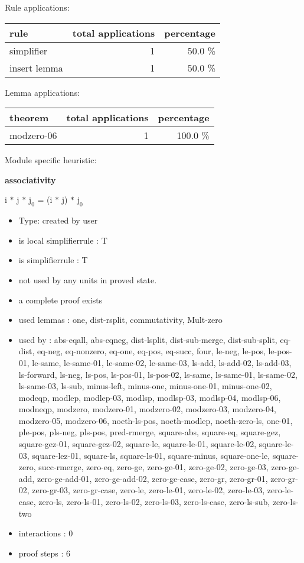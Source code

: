 \documentclass[a4paper]{article}
\begin{document}
Rule applications:

\begin{supertabular}{l|r|r}
rule	        & total applications & percentage \\ \hline
simplifier & 1 & 50.0 \% \\
insert lemma & 1 & 50.0 \% \\

\end{supertabular}

Lemma applications:

\begin{supertabular}{l|r|r}
theorem	        & total applications & percentage \\ \hline
modzero-06 & 1 & 100.0 \% \\

\end{supertabular}

Module specific heuristic:

\pagebreak

{\LARGE\bf associativity}\label{lemma-associativity}

\medskip

 \Fol i $*$ j $*$ $\mbox{j}_{0}$ = (i $*$ j) $*$ $\mbox{j}_{0}$

\begin{itemize}

\item Type: created by user

\item is local simplifierrule : T
\item is simplifierrule : T
\item not used by any units in proved state.
\item       a complete proof exists
\item       used lemmas  : one, dist-rsplit, commutativity, Mult-zero
\item       used by      : abs-eqall, abs-eqneg, dist-lsplit, dist-sub-merge, dist-sub-split, eq-dist, eq-neg, eq-nonzero, eq-one, eq-pos, eq-succ, four, le-neg, le-pos, le-pos-01, le-same, le-same-01, le-same-02, le-same-03, ls-add, ls-add-02, ls-add-03, ls-forward, ls-neg, ls-pos, ls-pos-01, ls-pos-02, ls-same, ls-same-01, ls-same-02, ls-same-03, ls-sub, minus-left, minus-one, minus-one-01, minus-one-02, modeqp, modlep, modlep-03, modlsp, modlsp-03, modlsp-04, modlsp-06, modneqp, modzero, modzero-01, modzero-02, modzero-03, modzero-04, modzero-05, modzero-06, noeth-ls-pos, noeth-modlep, noeth-zero-ls, one-01, ple-pos, pls-neg, pls-pos, pred-rmerge, square-abs, square-eq, square-gez, square-gez-01, square-gez-02, square-le, square-le-01, square-le-02, square-le-03, square-lez-01, square-ls, square-ls-01, square-minus, square-one-le, square-zero, succ-rmerge, zero-eq, zero-ge, zero-ge-01, zero-ge-02, zero-ge-03, zero-ge-add, zero-ge-add-01, zero-ge-add-02, zero-ge-case, zero-gr, zero-gr-01, zero-gr-02, zero-gr-03, zero-gr-case, zero-le, zero-le-01, zero-le-02, zero-le-03, zero-le-case, zero-ls, zero-ls-01, zero-ls-02, zero-ls-03, zero-ls-case, zero-ls-sub, zero-ls-two
\item       interactions : 0
\item       proof steps  : 6
\end{itemize}
\end{document}
